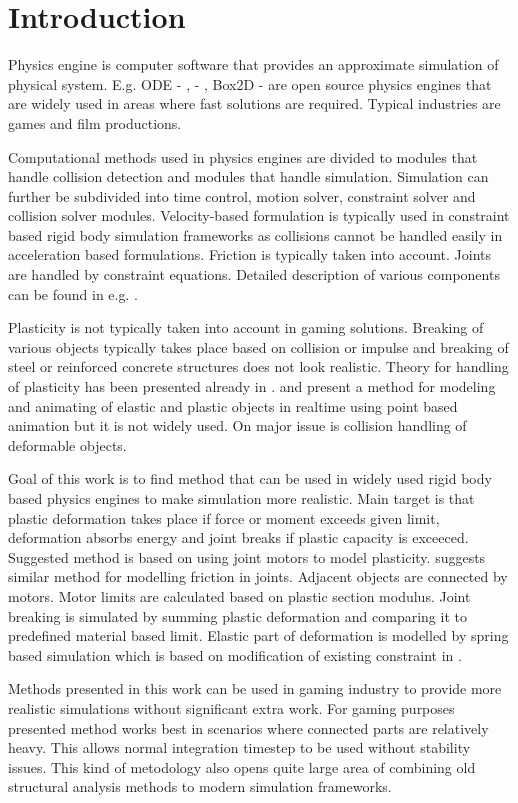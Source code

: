 \section{Introduction}

Physics engine is computer software that provides an approximate simulation of physical system. 
E.g. ODE - \cite{ode}, \bullet - \cite{bullet}, Box2D - \cite{box2d} are open source physics engines that are  widely used in 
areas where fast solutions are required. Typical industries are games and film productions.

Computational methods used in physics engines are divided to modules that handle collision detection and modules that handle simulation.
Simulation can further be subdivided into time control, motion solver, constraint solver and collision solver modules.
Velocity-based formulation is typically used in constraint based rigid body simulation 
frameworks as collisions cannot be handled easily in acceleration based formulations. 
Friction is typically taken into account. Joints are handled by constraint equations.
Detailed description of various components  can be found in e.g. \cite{erleben.thesis}.

Plasticity is not typically taken into account in gaming solutions. 
Breaking of various objects typically takes place based on collision or impulse and breaking of steel or 
reinforced concrete structures does not look realistic.
Theory for handling of plasticity has been presented already in \cite{cg1988}. 
\cite{muller2004point} and \cite{muller2005meshless} present a method for 
modeling and animating of elastic and plastic objects in realtime using point based animation but it is not widely used.
On major issue is collision handling of deformable objects.

Goal of this work is to find method that can be used in widely used rigid body based physics engines to make simulation more realistic.
Main target is that plastic deformation takes place if force or moment exceeds given limit, deformation absorbs energy and 
joint breaks if plastic capacity is exceeced. Suggested method is based on using joint motors to model plasticity. 
\cite[p.~90]{erleben.thesis} suggests similar method for modelling friction in joints.
Adjacent objects are connected by motors. Motor limits are calculated based on plastic section modulus.
Joint breaking is simulated by summing plastic deformation and comparing it to predefined material based limit.
Elastic part of deformation is modelled by spring based simulation which is based on modification of existing constraint in \bullet.

Methods presented in this work can be used in gaming industry to provide more realistic simulations without significant extra work. 
For gaming purposes presented method works best in scenarios where connected parts are relatively heavy. 
This allows normal integration timestep to be used without stability issues.
This kind of metodology also opens quite large area of combining old structural analysis methods to modern simulation frameworks.
